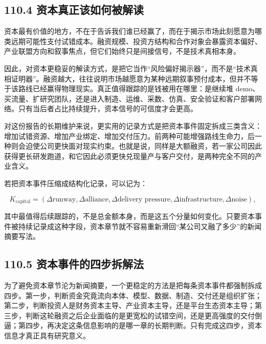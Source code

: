 \subsection*{110.4 资本真正该如何被解读}


资本最有价值的地方，不在于告诉我们谁已经赢了，而在于揭示市场此刻愿意为哪类远期可能性支付试错成本。融资规模、投资方结构和合作对象会暴露资本偏好、产业联盟方向和叙事焦点，但它们始终只是间接信号，不是技术真相本身。

因此，对资本更稳妥的解读方式，是把它当作“风险偏好揭示器”，而不是“技术真相证明器”。融资越大，往往说明市场越愿意为某种远期叙事预付成本，但并不等于该路线已经赢得物理现实。真正值得跟踪的是钱被用在哪里：是继续堆 demo、买流量、扩研究团队，还是进入制造、运维、采数、仿真、安全验证和客户部署网络。只有当后者占比持续提升，资本信号的可信度才会更高。

对这份报告的长期维护来说，更实用的记录方式是把资本事件固定拆成三类含义：增加试错资源、增加产业绑定、增加交付压力。前两种可能增强路线生命力，后一种则会迫使公司更快面对现实约束。也就是说，同样是大额融资，若一家公司因此获得更长研发跑道，和它因此必须更快兑现量产与客户交付，是两种完全不同的产业含义。

若把资本事件压缩成结构化记录，可以记为：

\begingroup
\scriptsize
\begin{equation*}
K_{\text{capital}} = (\Delta \text{runway}, \Delta \text{alliance}, \Delta \text{delivery pressure}, \Delta \text{infrastructure}, \Delta \text{noise}),
\end{equation*}
\endgroup

其中最值得后续跟踪的，不是总金额本身，而是这五个分量如何变化。只要资本事件被持续记录成这种字段，资本章节就不容易重新滑回“某公司又融了多少”的新闻摘要写法。

\subsection*{110.5 资本事件的四步拆解法}


为了避免资本章节沦为新闻摘要，一个更稳定的方法是把每条资本事件都强制拆成四步。第一步，判断资金究竟流向本体、模型、数据、制造、交付还是组织扩张；第二步，判断投资人是财务资本主导、产业资本主导，还是平台生态资本主导；第三步，判断这轮融资之后企业面临的是更宽松的试错空间，还是更高强度的交付倒逼；第四步，再决定这条信息影响的是哪一章的长期判断。只有完成这四步，资本信息才真正具有研究意义。

